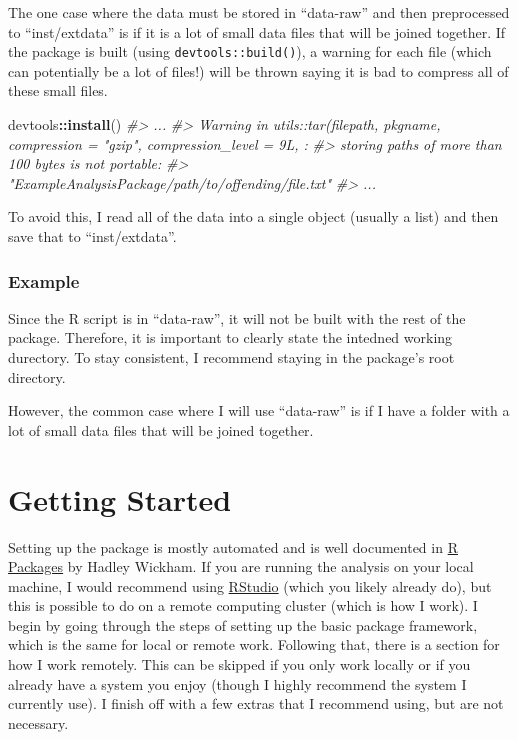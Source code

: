 \documentclass[]{book}
\newenvironment{Shaded}{\begin{snugshade}}{\end{snugshade}}
\newcommand{\CommentTok}[1]{\textcolor[rgb]{0.56,0.35,0.01}{\textit{#1}}}
\newcommand{\KeywordTok}[1]{\textcolor[rgb]{0.13,0.29,0.53}{\textbf{#1}}}
\newcommand{\NormalTok}[1]{#1}
\newcommand{\OperatorTok}[1]{\textcolor[rgb]{0.81,0.36,0.00}{\textbf{#1}}}
\begin{document}
The one case where the data must be stored in ``data-raw'' and then preprocessed to ``inst/extdata'' is if it is a lot of small data files that will be joined together. If the package is built (using \texttt{devtools::build()}), a warning for each file (which can potentially be a lot of files!) will be thrown saying it is bad to compress all of these small files.

\begin{Shaded}
\begin{Highlighting}[]
\NormalTok{devtools}\OperatorTok{::}\KeywordTok{install}\NormalTok{()}
\CommentTok{#> ...}
\CommentTok{#> Warning in utils::tar(filepath, pkgname, compression = "gzip", compression_level = 9L,  :}
\CommentTok{#>      storing paths of more than 100 bytes is not portable:}
\CommentTok{#>      "ExampleAnalysisPackage/path/to/offending/file.txt"}
\CommentTok{#> ...}
\end{Highlighting}
\end{Shaded}

To avoid this, I read all of the data into a single object (usually a list) and then save that to ``inst/extdata''.

\hypertarget{example}{%
\subsection{Example}\label{example}}

Since the R script is in ``data-raw'', it will not be built with the rest of the package. Therefore, it is important to clearly state the intedned working durectory. To stay consistent, I recommend staying in the package's root directory.

However, the common case where I will use ``data-raw'' is if I have a folder with a lot of small data files that will be joined together.

\hypertarget{getting-started}{%
\chapter{Getting Started}\label{getting-started}}

Setting up the package is mostly automated and is well documented in \href{https://r-pkgs.org/index.html}{R Packages} by Hadley Wickham. If you are running the analysis on your local machine, I would recommend using \href{https://www.rstudio.com}{RStudio} (which you likely already do), but this is possible to do on a remote computing cluster (which is how I work). I begin by going through the steps of setting up the basic package framework, which is the same for local or remote work. Following that, there is a section for how I work remotely. This can be skipped if you only work locally or if you already have a system you enjoy (though I highly recommend the system I currently use). I finish off with a few extras that I recommend using, but are not necessary.
\end{document}
